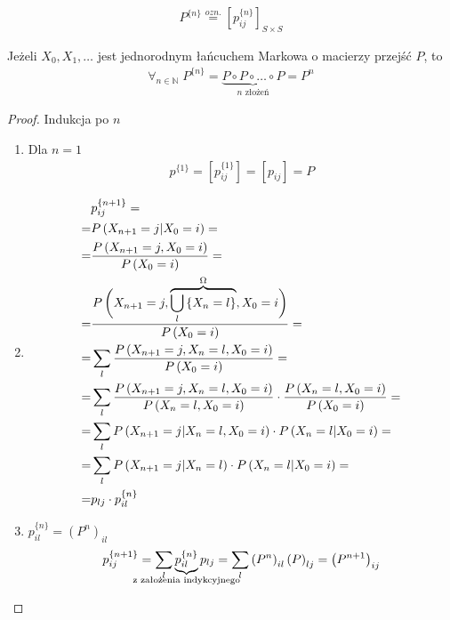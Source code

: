 \begin{gather*}
P^{\{n\}}\stackrel{ozn.}{=}\left[p_{ij}^{\{n\}}\right]_{S\times S}
\end{gather*}
\begin{twr}
Jeżeli $ X_0,X_1,\dots  $ jest jednorodnym łańcuchem Markowa o macierzy przejść $ P $, to
\begin{gather*}
\forall_{n\in \mathbb N }\;P^{\{n\}}=
\underbrace{P\circ P\circ \dots\circ P}_{n\text{ złożeń}}=
P^n
\end{gather*}
\begin{proof}
Indukcja po $ n $\\
\begin{enumerate}
\item Dla $ n=1 $
\begin{gather*}
p^{\{1\}}=
\left[p_{ij}^{\{1\}}\right]=
\left[p_{ij}\right]=P
\end{gather*} 
\item 
\begin{align*}
&p_{ij}^{\{n+1\}}
=\\=&
P\left(X_{n+1}=j|X_0=i\right)
=\\=&
\frac{P\left(X_{n+1}=j,X_0=i\right)}{P\left(X_0=i\right)}
=\\=&
\frac{P\vphantom{\overbrace{\bigcup_l\left\{X_n=l\right\}}^\Omega}\left(\vphantom{\bigcup\limits_l\left\{X_n=l\right\}}X_{n+1}=j,\smash{\overbrace{\bigcup_l\left\{X_n=l\right\}}^\Omega},X_0=i\right)}{P\left(X_0=i\right)}
=\\=&
\sum_l\frac{P\left(X_{n+1}=j,X_n=l,X_0=i\right)}{P\left(X_0=i\right)}
=\\=&
\sum_l\frac{P\left(X_{n+1}=j,X_n=l,X_0=i\right)}{P\left(X_n=l,X_0=i\right)}\cdot
\frac{P\left(X_n=l,X_0=i\right)}{P\left(X_0=i\right)}
=\\=&
\sum_lP\left(X_{n+1}=j|X_n=l,X_0=i\right)\cdot
P\left(X_n=l|X_0=i\right)
=\\=&
\sum_lP\left(X_{n+1}=j|X_n=l\right)\cdot
P\left(X_n=l|X_0=i\right)
=\\=&
p_{lj}\cdot p_{il}^{\{n\}}
\end{align*}
\item 
$ p_{il}^{\{n\}}=\left(P^n\right)_{il} $
\begin{gather*}
p_{ij}^{\{n+1\}}=\sum_l \underbrace{p_{il}^{\{n\}}}_{\mathclap{\text{z założenia indykcyjnego}}}p_{lj}=
\sum_l \left(P^n\right)_{il}\left(P\right)_{lj}=
\left(P^{n+1}\right)_{ij}
\end{gather*}
\end{enumerate}
\end{proof}
\end{twr}
